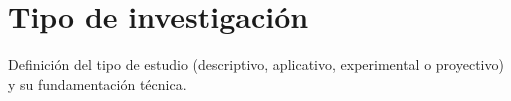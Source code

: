 \section{Tipo de investigación}
\label{sec:tipo_investigacion}
Definición del tipo de estudio (descriptivo, aplicativo, experimental o proyectivo) y su fundamentación técnica.
